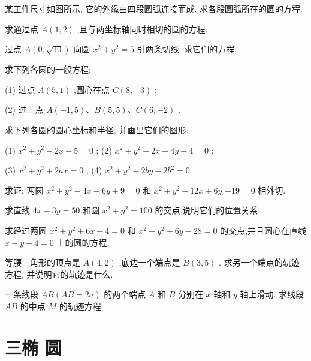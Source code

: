 \documentclass[lang=cn,newtx,10.5pt,scheme=chinese]{elegantbook}
\begin{document}
\begin{problemset}[习 题 五]
\item 某工件尺寸如图所示, 它的外缘由四段圆弧连接而成. 求各段圆弧所在的圆的方程.

\item 求通过点 \(A\left( {1,2}\right)\) ,且与两坐标轴同时相切的圆的方程.

\item 过点 \(A\left( {0,\sqrt{10}}\right)\) 向圆 \({x}^{2} + {y}^{2} = 5\) 引两条切线. 求它们的方程.

\item 求下列各圆的一般方程:

(1) 过点 \(A\left( {5,1}\right)\) ,圆心在点 \(C\left( {8, - 3}\right)\) ;

(2) 过三点 \(A\left( {-1,5}\right) \text{、}B\left( {5,5}\right) \text{、}C\left( {6, - 2}\right)\) .

\item 求下列各圆的圆心坐标和半径, 并画出它们的图形:

(1) \({x}^{2} + {y}^{2} - {2x} - 5 = 0\) ; (2) \({x}^{2} + {y}^{2} + {2x} - {4y} - 4 = 0\) ;

(3) \({x}^{2} + {y}^{2} + {2ax} = 0\) ; (4) \({x}^{2} + {y}^{2} - {2by} - 2{b}^{2} = 0\) .

\item 求证: 两圆 \({x}^{2} + {y}^{2} - {4x} - {6y} + 9 = 0\) 和 \({x}^{2} + {y}^{2} + {12x} + {6y}\) \(- {19} = 0\) 相外切.

\item 求直线 \({4x} - {3y} = {50}\) 和圆 \({x}^{2} + {y}^{2} = {100}\) 的交点,说明它们的位置关系.

\item 求经过两圆 \({x}^{2} + {y}^{2} + {6x} - 4 = 0\) 和 \({x}^{2} + {y}^{2} + {6y} - {28} = 0\) 的交点,并且圆心在直线 \(x - y - 4 = 0\) 上的圆的方程.

\item 等腰三角形的顶点是 \(A\left( {4,2}\right)\) ,底边一个端点是 \(B\left( {3,5}\right)\) . 求另一个端点的轨迹方程, 并说明它的轨迹是什么.

\item 一条线段 \({AB}\left( {{AB} = {2a}}\right)\) 的两个端点 \(A\) 和 \(B\) 分别在 \(x\) 轴和 \(y\) 轴上滑动. 求线段 \({AB}\) 的中点 \(M\) 的轨迹方程.
\end{problemset}

\section*{三\text{ }椭 圆}
\end{document}
